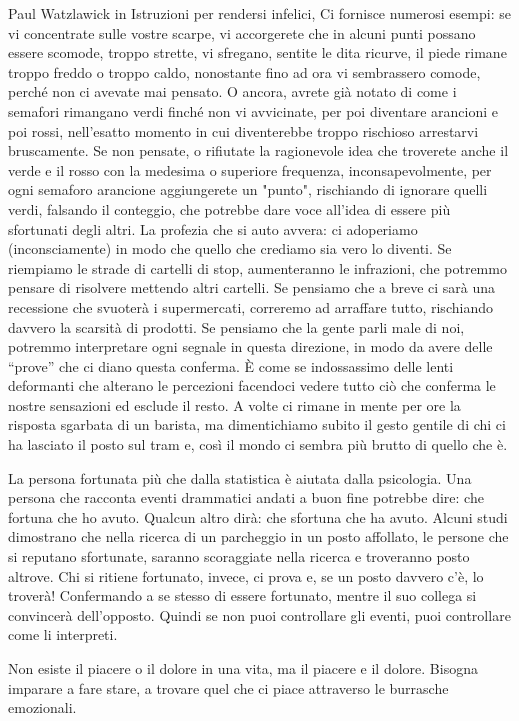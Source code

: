 \documentclass[12pt]{book} %
\begin{document}
Paul Watzlawick in Istruzioni per rendersi infelici, Ci fornisce
numerosi esempi: se vi concentrate sulle vostre scarpe, vi accorgerete che in alcuni punti possano essere scomode,
troppo strette, vi sfregano, sentite le dita ricurve, il piede rimane troppo freddo o troppo caldo, nonostante fino ad
ora vi sembrassero comode, perché non ci avevate mai pensato. O ancora, avrete già notato di come i semafori rimangano
verdi finché non vi avvicinate, per poi diventare arancioni e poi rossi, nell'esatto momento in
cui diventerebbe troppo rischioso arrestarvi bruscamente. Se non pensate, o rifiutate la ragionevole idea che troverete
anche il verde e il rosso con la medesima o superiore frequenza, inconsapevolmente, per ogni semaforo arancione
aggiungerete un "punto", rischiando di ignorare quelli verdi, falsando il conteggio, che potrebbe dare voce all'idea di essere più sfortunati degli
altri. La profezia che si auto avvera: ci adoperiamo (inconsciamente) in modo che quello che crediamo sia vero lo
diventi. Se riempiamo le strade di cartelli di stop, aumenteranno le infrazioni, che potremmo pensare di risolvere
mettendo altri cartelli. Se pensiamo che a breve ci sarà una recessione che svuoterà i supermercati, correremo ad
arraffare tutto, rischiando davvero la scarsità di prodotti. Se pensiamo che la gente parli male di noi, potremmo interpretare 
ogni segnale in questa direzione, in modo da avere delle “prove” che ci diano questa conferma. È come se indossassimo
delle lenti deformanti che alterano le percezioni facendoci vedere tutto ciò che conferma le nostre sensazioni ed
esclude il resto. A volte ci rimane in mente per ore la risposta sgarbata di un
barista, ma dimentichiamo subito il gesto gentile di chi ci ha lasciato il posto sul tram e, così il mondo ci sembra
più brutto di quello che è.

La persona fortunata più che dalla statistica è aiutata dalla psicologia. Una persona che racconta eventi drammatici
andati a buon fine potrebbe dire: che fortuna che ho avuto. Qualcun altro dirà: che sfortuna che ha avuto. 
Alcuni studi dimostrano che nella ricerca di un parcheggio in un posto affollato, le persone
che si reputano sfortunate, saranno scoraggiate nella ricerca e troveranno posto altrove. Chi si ritiene fortunato,
invece, ci prova e, se un posto davvero c'è, lo troverà! Confermando a se stesso di essere fortunato, mentre il suo
collega si convincerà dell'opposto. Quindi se non puoi controllare gli eventi, puoi controllare
come li interpreti.

Non esiste il piacere o il dolore in una vita, ma il piacere e il dolore. Bisogna imparare a fare stare, a trovare quel
che ci piace attraverso le burrasche emozionali.
\end{document}
